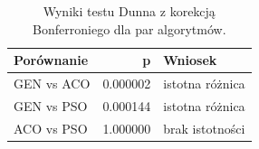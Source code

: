 \begin{table}
\caption{Wyniki testu Dunna z korekcją Bonferroniego dla par algorytmów.}
\label{tab:dunn_pairs}
\begin{tabular}{lrl}
\toprule
Porównanie & p & Wniosek \\
\midrule
GEN vs ACO & 0.000002 & istotna różnica \\
GEN vs PSO & 0.000144 & istotna różnica \\
ACO vs PSO & 1.000000 & brak istotności \\
\bottomrule
\end{tabular}
\end{table}
